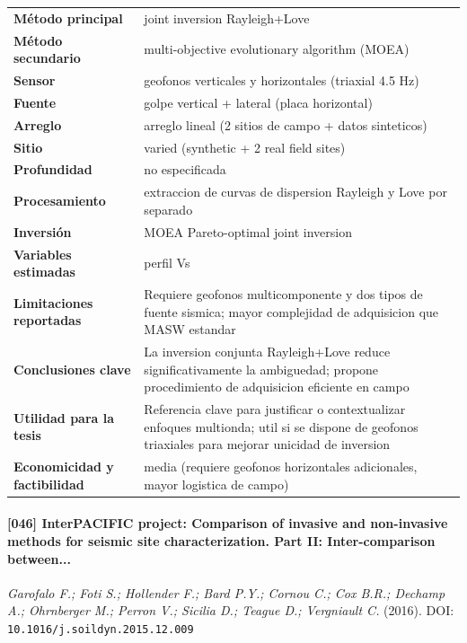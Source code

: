 \begin{center}\scriptsize
\begin{tabularx}{\textwidth}{@{}>{\bfseries}p{3.3cm} X@{}}
\toprule
M\'etodo principal & joint inversion Rayleigh+Love \\
M\'etodo secundario & multi-objective evolutionary algorithm (MOEA) \\
Sensor & geofonos verticales y horizontales (triaxial 4.5 Hz) \\
Fuente & golpe vertical + lateral (placa horizontal) \\
Arreglo & arreglo lineal (2 sitios de campo + datos sinteticos) \\
Sitio & varied (synthetic + 2 real field sites) \\
Profundidad & no especificada \\
Procesamiento & extraccion de curvas de dispersion Rayleigh y Love por separado \\
Inversi\'on & MOEA Pareto-optimal joint inversion \\
Variables estimadas & perfil Vs \\
Limitaciones reportadas & Requiere geofonos multicomponente y dos tipos de fuente sismica; mayor complejidad de adquisicion que MASW estandar \\
Conclusiones clave & La inversion conjunta Rayleigh+Love reduce significativamente la ambiguedad; propone procedimiento de adquisicion eficiente en campo \\
Utilidad para la tesis & Referencia clave para justificar o contextualizar enfoques multionda; util si se dispone de geofonos triaxiales para mejorar unicidad de inversion \\
Economicidad y factibilidad & media (requiere geofonos horizontales adicionales, mayor logistica de campo) \\
\bottomrule
\end{tabularx}
\end{center}

\paragraph{[046] InterPACIFIC project: Comparison of invasive and non-invasive methods for seismic site characterization. Part II: Inter-comparison between...} \emph{Garofalo F.; Foti S.; Hollender F.; Bard P.Y.; Cornou C.; Cox B.R.; Dechamp A.; Ohrnberger M.; Perron V.; Sicilia D.; Teague D.; Vergniault C.} (2016).
{\scriptsize DOI: \texttt{10.1016/j.soildyn.2015.12.009}}

